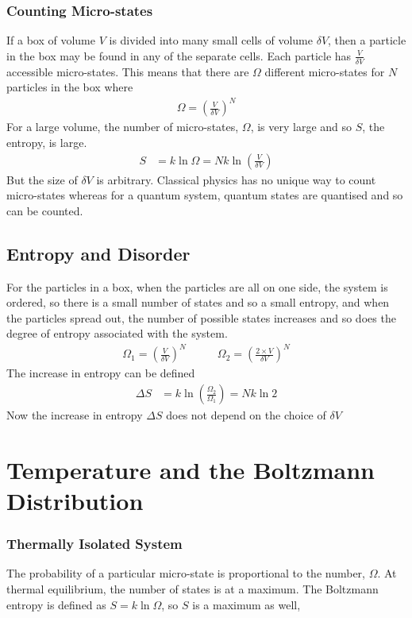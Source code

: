 \documentclass[british]{article}
\begin{document}
\subsubsection{Counting Micro-states}
If a box of volume $V$ is divided into many small cells of volume $\delta V$, then a particle in the box may be found in any of the separate cells. Each particle has $\frac{V}{\delta V}$ accessible micro-states. This means that there are $\Omega$ different micro-states for $N$ particles in the box where 
\begin{align*}
	\Omega = \left(\frac{V}{\delta V}\right)^N
\end{align*}
For a large volume, the number of micro-states, $\Omega$, is very large and so $S$, the entropy, is large. 
\begin{align*}
	S &= k\ln\Omega = Nk\ln\left(\frac{V}{\delta V}\right)
\end{align*}
But the size of $\delta V$ is arbitrary. Classical physics has no unique way to count micro-states whereas for a quantum system, quantum states are quantised and so can be counted.

\subsection{Entropy and Disorder}
For the particles in a box, when the particles are all on one side, the system is ordered, so there is a small number of states and so a small entropy, and when the particles spread out, the number of possible states increases and so does the degree of entropy associated with the system.
\begin{align*}
	\Omega_1 = \left(\frac{V}{\delta V}\right)^N &\qquad \Omega_2 = \left(\frac{2\times V}{\delta V}\right)^N
\end{align*}
The increase in entropy can be defined
\begin{align*}
	\Delta S &= k\ln\left(\frac{\Omega_2}{\Omega_1} \right) = Nk\ln2
\end{align*}
Now the increase in entropy $\Delta S$ does not depend on the choice of $\delta V$

\section{Temperature and the Boltzmann Distribution}
\subsubsection{Thermally Isolated System}
The probability of a particular micro-state is proportional to the number, $\Omega$. At thermal equilibrium, the number of states is at a maximum. The Boltzmann entropy is defined as $S=k\ln\Omega$, so $S$ is a maximum as well,
\end{document}
